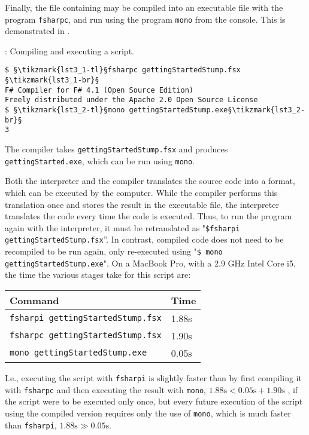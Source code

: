 Finally, the file containing  may be compiled into an executable file with the program \lstinline[language=console]{fsharpc}, and run using the program \lstinline[language=console]{mono} from the console. This is demonstrated in .
%
\begin{codeNOutput}[label=compiler]{: Compiling and executing a script.}
\begin{lstlisting}[language=console,escapechar=§]
$ §\tikzmark{lst3_1-tl}§fsharpc gettingStartedStump.fsx §\tikzmark{lst3_1-br}§
F# Compiler for F# 4.1 (Open Source Edition)
Freely distributed under the Apache 2.0 Open Source License
$ §\tikzmark{lst3_2-tl}§mono gettingStartedStump.exe§\tikzmark{lst3_2-br}§
3
\end{lstlisting}
\end{codeNOutput}
%
%
%
The compiler takes \lstinline[language=console]{gettingStartedStump.fsx} and produces \lstinline[language=console]{gettingStarted.exe}, which can be run using \lstinline[language=console]{mono}.

Both the interpreter and the compiler translates the source code into a format, which can be executed by the computer. While the compiler performs this translation once and stores the result in the executable file, the interpreter translates the code every time the code is executed. Thus, to run the program again with the interpreter, it must be retranslated as "\lstinline[language=console]{$fsharpi gettingStartedStump.fsx}''. %
In contrast, compiled code does not need to be recompiled to be run again, only re-executed using "\lstinline[language=console]{$ mono gettingStartedStump.exe}". %
On a MacBook Pro, with a 2.9 GHz Intel Core i5, the time the various stages take for this script are:
\begin{center}
  \begin{tabular}{|l|l|}
    \hline
    \rowcolor{headerRowColor} Command & Time\\
    \hline
    \lstinline[language=console]|fsharpi gettingStartedStump.fsx| & 1.88s\\
    \lstinline[language=console]|fsharpc gettingStartedStump.fsx| & 1.90s\\
    \lstinline[language=console]|mono gettingStartedStump.exe| & 0.05s\\
    \hline
\end{tabular}
\end{center}
I.e., executing the script with \lstinline[language=console]|fsharpi| is slightly faster than by first compiling it with \lstinline[language=console]|fsharpc| and then executing the result with \lstinline[language=console]|mono|, $1.88\text{s} < 0.05\text{s}+1.90\text{s}$ , if the script were to be executed only once, but every future execution of the script using the compiled version requires only the use of \lstinline[language=console]|mono|, which is much faster than \lstinline[language=console]|fsharpi|, $1.88\text{s}\gg 0.05\text{s}$.

